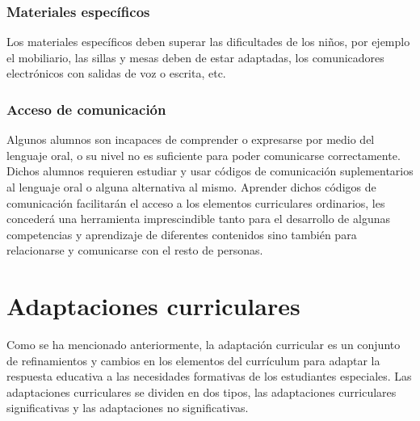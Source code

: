 \subsubsection{ Materiales específicos}
Los materiales específicos deben superar las dificultades de los niños, por ejemplo el mobiliario, las sillas y mesas deben de estar adaptadas, los comunicadores electrónicos con salidas de voz o escrita, etc.
\subsubsection{Acceso de comunicación}
Algunos alumnos son incapaces de comprender o expresarse por medio del lenguaje oral, o su nivel no es suficiente para poder comunicarse correctamente. Dichos alumnos requieren estudiar y  usar códigos de comunicación suplementarios al lenguaje oral  o alguna alternativa al mismo.   Aprender dichos códigos de comunicación facilitarán el acceso a los elementos curriculares ordinarios, les concederá una herramienta imprescindible tanto para el desarrollo de algunas competencias  y aprendizaje de diferentes contenidos sino también para relacionarse  y comunicarse con el resto de personas.

\section{Adaptaciones curriculares}
Como se ha mencionado anteriormente, la adaptación curricular es un conjunto de refinamientos y cambios en los elementos del currículum para adaptar la respuesta educativa a las necesidades formativas de los estudiantes especiales. 
Las adaptaciones curriculares se dividen en dos tipos, las adaptaciones curriculares significativas y las adaptaciones no significativas. 
